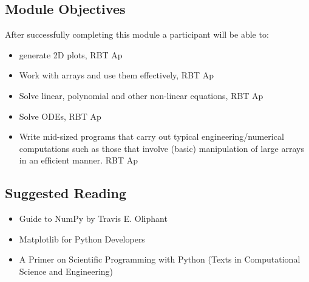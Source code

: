 \documentclass{article}
\begin{document}
\subsection{Module Objectives}
After successfully completing this module a participant will be able to:
        \begin{itemize}
            \item generate 2D plots, \hfill RBT Ap
            \item Work with arrays and use them effectively, \hfill RBT Ap
            \item Solve linear, polynomial and other non-linear equations, \hfill RBT Ap
            \item Solve ODEs, \hfill RBT Ap
            \item Write mid-sized programs that carry out typical engineering/numerical computations such as those that involve (basic) manipulation of large arrays in an efficient manner. \hfill RBT Ap
        \end{itemize}
\subsection{Suggested Reading}
\begin{itemize}
    \item Guide to NumPy by Travis E. Oliphant
    \item Matplotlib for Python Developers
    \item A Primer on Scientific Programming with Python (Texts in Computational Science and Engineering)
\end{itemize}
\end{document}
